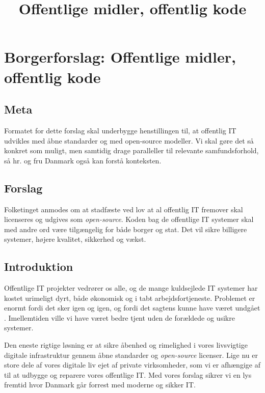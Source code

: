 \documentclass[fleqn]{article}
\title{Offentlige midler, offentlig kode}
\author{}
\begin{document}
\maketitle

\setcounter{secnumdepth}{0}

\section{Borgerforslag: Offentlige midler, offentlig kode}

\subsection{Meta}
Formatet for dette forslag skal underbygge henstillingen til, at offentlig IT udvikles
med åbne standarder og med open-source modeller. Vi skal gøre det så konkret som muligt,
men samtidig drage paralleller til relevante samfundsforhold, så hr. og fru Danmark også 
kan forstå konteksten.

\subsection{Forslag}
\begin{large}
Folketinget anmodes om at stadfæste ved lov at al offentlig IT fremover skal licenseres
og udgives som \textit{open-source}. Koden bag de offentlige IT systemer skal med andre ord
være tilgængelig for både borger og stat. Det vil sikre billigere systemer, højere
kvalitet, sikkerhed og vækst.
\end{large}

\subsection{Introduktion}
Offentlige IT projekter vedrører os alle, og de mange kuldsejlede IT systemer har
kostet urimeligt dyrt, både økonomisk og i tabt arbejdsfortjeneste. Problemet er enormt
fordi det sker igen og igen, og fordi det sagtens kunne have været undgået \cite{ITU}.
Imellemtiden ville vi have været bedre tjent uden de forældede og usikre systemer.

Den eneste rigtige løsning er at sikre åbenhed og rimelighed i vores livsvigtige
digitale infrastruktur gennem åbne standarder og \textit{open-source} licenser.
Lige nu er store dele af vores digitale liv ejet af private virksomheder, som vi
er afhængige af til at udbygge og reparere vores offentlige IT. Med vores
forslag sikrer vi en lys fremtid hvor Danmark går forrest med moderne og sikker IT.
\end{document}
